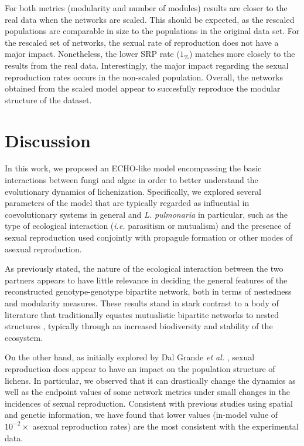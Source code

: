 \documentclass[fleqn,10pt]{wlscirep}
\begin{document}
For both metrics (modularity and number of modules) results are closer to the real data when the networks are scaled. This should be expected, as the rescaled populations are comparable in size to the populations in the original data set. For the rescaled set of networks, the sexual rate of reproduction does not have a major impact. Nonetheless, the lower SRP rate ($1_\%$) matches more closely to the results from the real data. Interestingly, the major impact regarding the sexual reproduction rates occurs in the non-scaled population. Overall, the networks obtained from the scaled model appear to succesfully reproduce the modular structure of the dataset.

\section{Discussion}
  In this work, we proposed an ECHO-like model encompassing the basic interactions between fungi and algae in order to better understand the evolutionary dynamics of lichenization. Specifically, we explored several parameters of the model that are typically regarded as influential in coevolutionary systems in general and {\em L. pulmonaria} in particular, such as the type of ecological interaction ({\em i.e.} parasitism or mutualism) and the presence of sexual reproduction used conjointly with propagule formation or other modes of asexual reproduction. 

As previously stated, the nature of the ecological interaction between the two partners appears to have little relevance in deciding the general features of the reconstructed genotype-genotype bipartite network, both in terms of nestedness and modularity measures. These results stand in stark contrast to a body of literature that traditionally equates mutualistic bipartite networks to nested structures \cite{bascompte2006structure}, typically through an increased biodiversity \cite{bascompte2006asymmetric} and stability \cite{rohr2014structural} of the ecosystem. 

On the other hand, as initially explored by Dal Grande {\em et al.} \cite{dal2012vertical}, sexual reproduction does appear to have an impact on the population structure of lichens. In particular, we observed that it can drastically change the dynamics as well as the endpoint values of some network metrics under small changes in the incidences of sexual reproduction. Consistent with previous studies \cite{dal2012vertical} using spatial and genetic information, we have found that lower values (in-model value of $10^{-2}\times$ asexual reproduction rates) are the most consistent with the experimental data.
\end{document}
